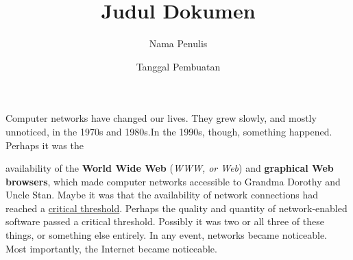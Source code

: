\documentclass [a4paper,12pt] {report}
\begin{document}
\title{Judul Dokumen}
\author{Nama Penulis}
\date{Tanggal Pembuatan}

Computer networks have changed our lives. They grew slowly, and mostly unnoticed, in the 1970s and 1980s.\newline In the 1990s, though, something happened. Perhaps it was the 

availability of the \textbf{World Wide Web} (\textit{WWW, or Web}) and \textbf{graphical Web browsers}, which made computer networks accessible to Grandma Dorothy and Uncle Stan. \linebreak Maybe it was that the availability of network connections had reached a \underline{critical threshold}. Perhaps the quality and quantity of network-enabled software passed a critical threshold. Possibly it was two or all three of these things, or something else entirely. In any event, networks became noticeable. Most importantly, the Internet became noticeable.
\end{document}
